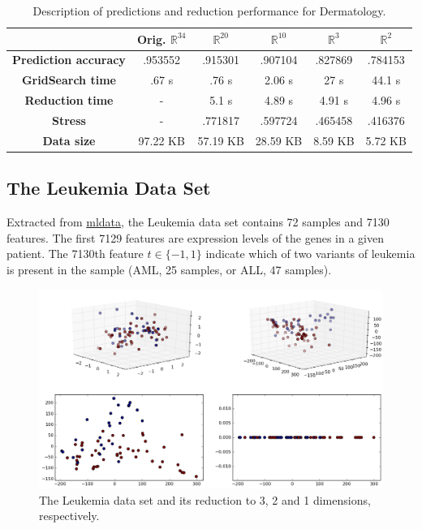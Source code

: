 \documentclass[12pt]{report}
\begin{document}
\begin{table}[H]
	\centering
	\begin{tabular}{|c|c|c|c|c|c|}
		\hline
		& \textbf{Orig. $\mathbb{R}^{34}$} & \textbf{$\mathbb{R}^{20}$} & \textbf{$\mathbb{R}^{10}$} & \textbf{$\mathbb{R}^3$} & \textbf{$\mathbb{R}^2$} \\\hline
		\textbf{Prediction accuracy}  & .953552 & .915301 & .907104 & .827869 & .784153 \\\hline
		\textbf{GridSearch time} & .67 s & .76 s & 2.06 s & 27 s & 44.1 s  \\\hline
		\textbf{Reduction time}  & -         & 5.1 s & 4.89 s & 4.91 s & 4.96 s    \\\hline
		\textbf{Stress} & - & .771817 & .597724 & .465458 & .416376 \\\hline
		\textbf{Data size}          & 97.22 KB & 57.19 KB & 28.59 KB  & 8.59 KB & 5.72 KB  \\\hline
	\end{tabular}

	\caption{Description of predictions and reduction performance for Dermatology.}
\end{table}

\newpage
\subsection{The Leukemia Data Set}

Extracted from \href{http://mldata.com}{mldata}, the Leukemia data set contains 72 samples and 7130 features. The first 7129 features are expression levels of the genes in a given patient. The 7130th feature $t \in \{-1, 1\}$ indicate which of two variants of leukemia is present in the sample (AML, 25 samples, or ALL, 47 samples). \cite{on:duc_ds}

\begin{figure}[H]
	\centering
	\includegraphics[width=.9\linewidth]{img/experiments/iso_leukemia}
	\captionsetup{justification=centering}
	\caption{The Leukemia data set and its reduction to 3, 2 and 1 dimensions, respectively.}
	\label{fig:leukemiads}
\end{figure}
\end{document}
